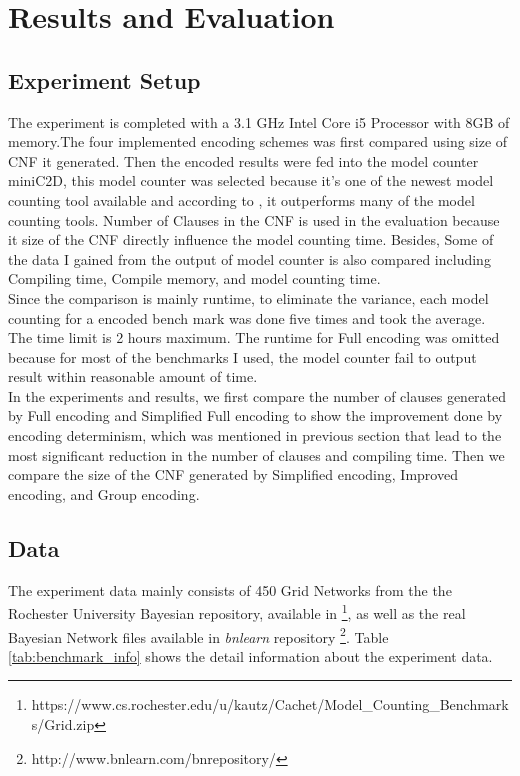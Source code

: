 \newpage
\section{Results and Evaluation}
\subsection{Experiment Setup}
The experiment is completed with a 3.1 GHz Intel Core i5 Processor with 8GB of memory.The four implemented encoding schemes was first compared using size of CNF it generated. Then the encoded results were fed into the model counter miniC2D, this model counter was selected because it's one of the newest model counting tool available and according to \cite{minic2d}, it outperforms many of the model counting tools. Number of Clauses in the CNF is used in the evaluation because it size of the CNF directly influence the model counting time. Besides, Some of the data I gained from the output of model counter is also compared including Compiling time, Compile memory, and model counting time.\\

\noindent Since the comparison is mainly runtime, to eliminate the variance, each model counting for a encoded bench mark was done five times and took the average. The time limit is 2 hours maximum. The runtime for Full encoding was omitted because for most of the benchmarks I used, the model counter fail to output result within reasonable amount of time.\\

\noindent In the experiments and results, we first compare the number of clauses generated by Full encoding and Simplified Full encoding to show the improvement done by encoding determinism, which was mentioned in previous section that lead to the most significant reduction in the number of clauses and compiling time. Then we compare the size of the CNF generated by Simplified encoding, Improved encoding, and Group encoding.

\subsection{Data}
The experiment data mainly consists of 450 Grid Networks from the the Rochester University Bayesian repository, available in 
\footnote{https://www.cs.rochester.edu/u/kautz/Cachet/Model\_Counting\_Benchmarks/Grid.zip}, as well as the real Bayesian Network files available in \textit{bnlearn} repository \footnote{http://www.bnlearn.com/bnrepository/}. Table \ref{tab:benchmark_info} shows the detail information about the experiment data.\\

